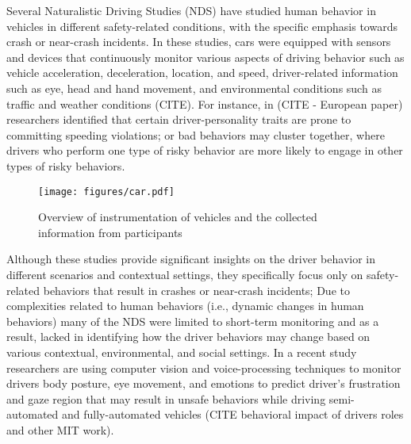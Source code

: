 Several Naturalistic Driving Studies (NDS) have studied human behavior in vehicles in different safety-related conditions, with the specific emphasis towards crash or near-crash incidents. 
In these studies, cars were equipped with sensors and devices that continuously monitor various aspects of driving behavior such as vehicle acceleration, deceleration, location, and speed, driver-related information such as eye, head and hand movement, and environmental conditions such as traffic and weather conditions (CITE). 
For instance, in (CITE - European paper) researchers identified that certain driver-personality traits are prone to committing speeding violations; 
or bad behaviors may cluster together, where drivers who perform one type of risky behavior are more likely to engage in other types of risky behaviors. \begin{figure}
    \centering
    \texttt{[image: figures/car.pdf]}
    \caption{Overview of instrumentation of vehicles and the collected information from participants}
    \label{fig:sensors}
\end{figure}
Although these studies provide significant insights on the driver behavior in different scenarios and contextual settings, they specifically focus only on safety-related behaviors that result in crashes or near-crash incidents; 
Due to complexities related to human behaviors (i.e., dynamic changes in human behaviors) many of the NDS were limited to short-term monitoring and as a result, lacked in identifying how the driver behaviors may change based on various contextual, environmental, and social settings. 
In a recent study researchers are using computer vision and voice-processing techniques to monitor drivers body posture, eye movement, and emotions to predict driver's frustration and gaze region that may result in unsafe behaviors while driving semi-automated and fully-automated vehicles (CITE behavioral impact of drivers roles and other MIT work). 
  
